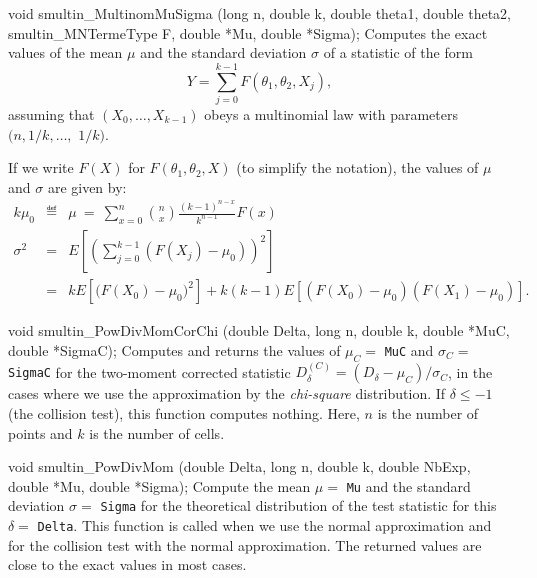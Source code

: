 void smultin_MultinomMuSigma (long n, double k, double theta1,
                              double theta2, smultin_MNTermeType F,
                              double *Mu, double *Sigma);
\endcode
 \tab
  Computes the exact values of the mean $\mu$ and the standard deviation
  $\sigma$ of a statistic of the form
  $$
    Y = \sum_{j=0}^{k-1} F(\theta_1, \theta_2, X_j),
  $$
  assuming that $(X_0,\ldots, X_{k-1})$
  obeys a multinomial law with parameters $(n, 1/k, \ldots,$ $1/k)$.

  If we write $F(X)$ for $F(\theta_1,\theta_2, X)$ (to simplify the notation),
  the values of $\mu$ and $\sigma$ are given by:
  \begin{eqnarray}
    k\mu_0 & \eqdef & \mu\ = \ \sum_{x=0}^n {n \choose x}
      \frac{(k-1)^{n-x}}{k^{n-1}} F(x) \label{eq:smultin-mu}  \\
   \sigma^2 &=& E\left[\left(\sum_{j=0}^{k-1}\left(F(X_j) - \mu_0 \right)
     \right)^2 \right]\\[6pt]
     &=& k E\left[\Big(F(X_0) - \mu_0 \Big)^2 \right] + k(k-1)
    E\left[\left(F(X_0) - \mu_0 \right) \left(F(X_1) - \mu_0 \right) \right].
                                              \label{eq:smultin-sigma2}
  \end{eqnarray}
\iffalse %
  We meet such multinomial  vectors in the following context:
  We throw $n$ balls into $k$ cells, independently and with a
  uniform probability $1/k$ for each cell, and we define
  $X_j$ as the number of balls falling into  cell $j$.
\fi  %
 \endtab
\code

void smultin_PowDivMomCorChi (double Delta, long n, double k,
                              double *MuC, double *SigmaC);
\endcode
 \tab
  Computes and returns the values of $\mu_C = $ {\tt MuC} and
  $\sigma_C = $ {\tt SigmaC} for the two-moment corrected statistic
  $D_\delta^{(C)} = (D_\delta - \mu_C) / \sigma_C$,
  in the cases where we use the approximation by the {\em chi-square\/}
  distribution.
  If $\delta \le -1$ (the collision test), this function computes nothing.
  Here, $n$ is the number of points and $k$ is the number of cells.
 \endtab
\code


void smultin_PowDivMom (double Delta, long n, double k,
                        double NbExp, double *Mu, double *Sigma);
\endcode
 \tab
  Compute the mean $\mu = $ {\tt Mu} and the standard deviation $\sigma = $
  {\tt Sigma} for the  theoretical distribution of the test statistic  for
  this  $\delta = $ {\tt Delta}.  This  function is called when we use the
  normal approximation and for the collision test with the normal 
  approximation.
  The returned  values are close to the exact values in most cases.
 \endtab


